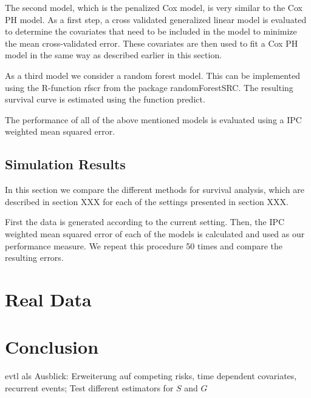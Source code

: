 \documentclass[12pt, a4paper]{article}
\theoremstyle{definition}
\theoremstyle{plain}
\numberwithin{equation}{section}
\numberwithin{figure}{section}
\numberwithin{table}{section}
\begin{document}
	The second model, which is the penalized Cox model, is very similar to the Cox PH model.
	As a first step, a cross validated generalized linear model is evaluated to determine the covariates that need to be included in the model to minimize the mean cross-validated error.
	These covariates are then used to fit a Cox PH model in the same way as described earlier in this section.
	
	As a third model we consider a random forest model.
	This can be implemented using the R-function rfscr from the package randomForestSRC.
	The resulting survival curve is estimated using the function predict.
	
	The performance of all of the above mentioned models is evaluated using a IPC weighted mean squared error.
	
	\subsection{Simulation Results}
	In this section we compare the different methods for survival analysis, which are described in section XXX for each of the settings presented in section XXX.
	
	First the data is generated according to the current setting.
	Then, the IPC weighted mean squared error of each of the models is calculated and used as our performance measure.
	We repeat this procedure 50 times and compare the resulting errors.
	
	
	\newpage
	\section{Real Data}
	\newpage
	\section{Conclusion}
	
	evtl als Ausblick: Erweiterung auf competing risks, time dependent covariates, recurrent events; Test different estimators for $S$ and $G$
	
	\newpage
	
	\thispagestyle{empty}
	
	
	
	\newpage
	
\end{document}
